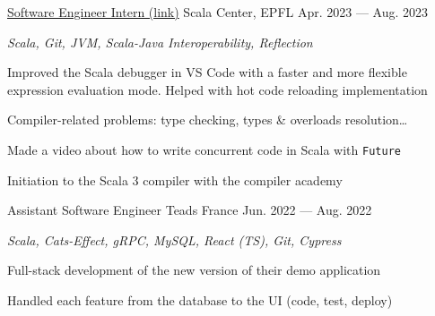 \begin{MainPart}
  \Experience%
  {\href{https://github.com/scalacenter/scala-debug-adapter/pulls?q=is\%3Apr+author\%3Aiusildra+}{Software Engineer Intern (link)}}
  {Scala Center, EPFL}
  {Apr. 2023 --- Aug. 2023}
  {
    \textit{Scala, Git, JVM, Scala-Java Interoperability, Reflection}
    \begin{ItemList}{\ColorHighlight}
      \item[\ding{226}] Improved the Scala debugger in VS Code with a faster and more flexible expression evaluation mode. Helped with hot code reloading implementation
      \item[\ding{226}] Compiler-related problems: type checking, types \& overloads resolution\dots
      \item[\ding{226}] Made a video about how to write concurrent code in Scala with \texttt{Future}
      \item[\ding{226}] Initiation to the Scala 3 compiler with the compiler academy
    \end{ItemList}
  }
  \Experience%
  {Assistant Software Engineer}
  {Teads France}
  {Jun. 2022 --- Aug. 2022}
  {
    \textit{Scala, Cats-Effect, gRPC, MySQL, React (TS), Git, Cypress}

    \begin{ItemList}{\ColorHighlight}
      \item[\ding{226}] Full-stack development of the new version of their demo application
      \item[\ding{226}] Handled each feature from the database to the UI (code, test, deploy)
    \end{ItemList}
  }
\end{MainPart}